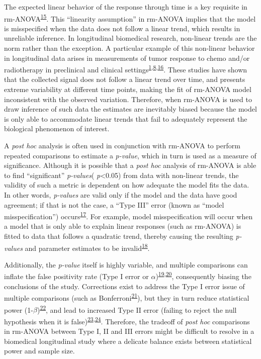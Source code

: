 \documentclass[
]{article}
\begin{document}
The expected linear behavior of the response through time is a key requisite in rm-ANOVA\textsuperscript{\protect\hyperlink{ref-pinheiro2006}{15}}. This ``linearity assumption'' in rm-ANOVA implies that the model is misspecified when the data does not follow a linear trend, which results in unreliable inference. In longitudinal biomedical research, non-linear trends are the norm rather than the exception. A particular example of this non-linear behavior in longitudinal data arises in measurements of tumor response to chemo and/or radiotherapy in preclinical and clinical settings\textsuperscript{\protect\hyperlink{ref-roblyer2011}{1},\protect\hyperlink{ref-skala2010}{8},\protect\hyperlink{ref-vishwanath2009}{16}}. These studies have shown that the collected signal does not follow a linear trend over time, and presents extreme variability at different time points, making the fit of rm-ANOVA model inconsistent with the observed variation. Therefore, when rm-ANOVA is used to draw inference of such data the estimates are inevitably biased because the model is only able to accommodate linear trends that fail to adequately represent the biological phenomenon of interest.

A \emph{post hoc} analysis is often used in conjunction with rm-ANOVA to perform repeated comparisons to estimate a \emph{p-value}, which in turn is used as a measure of significance.
Although it is possible that a \emph{post hoc} analysis of rm-ANOVA is able to find ``significant'' \emph{p-values}( \emph{p}\textless0.05) from data with non-linear trends, the validity of such a metric is dependent on how adequate the model fits the data. In other words, \emph{p-values} are valid only if the model and the data have good agreement; if that is not the case, a ``Type III'' error (known as ``model misspecification'') occurs\textsuperscript{\protect\hyperlink{ref-dennis2019}{17}}. For example, model misspecification will occur when a model that is only able to explain linear responses (such as rm-ANOVA) is fitted to data that follows a quadratic trend, thereby causing the resulting \emph{p-values} and parameter estimates to be invalid\textsuperscript{\protect\hyperlink{ref-wang2019}{18}}.

Additionally, the \emph{p-value} itself is highly variable, and multiple comparisons can inflate the false positivity rate (Type I error or \(\alpha\))\textsuperscript{\protect\hyperlink{ref-liu2010}{19},\protect\hyperlink{ref-halsey2015}{20}}, consequently biasing the conclusions of the study. Corrections exist to address the Type I error issue of multiple comparisons (such as Bonferroni\textsuperscript{\protect\hyperlink{ref-abdi2010}{21}}), but they in turn reduce statistical power (1-\(\beta\))\textsuperscript{\protect\hyperlink{ref-nakagawa2004}{22}}, and lead to increased Type II error (failing to reject the null hypothesis when it is false)\textsuperscript{\protect\hyperlink{ref-gelman2012}{23},\protect\hyperlink{ref-albers2019}{24}}. Therefore, the tradeoff of \emph{post hoc} comparisons in rm-ANOVA between Type I, II and III errors might be difficult to resolve in a biomedical longitudinal study where a delicate balance exists between statistical power and sample size.
\end{document}
